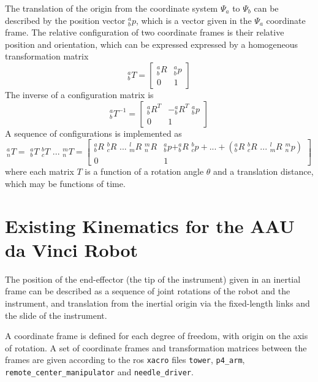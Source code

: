 The translation of the origin from the coordinate system $\Psi_a$ to $\Psi_b$ can be described by the position vector $^a_bp$, which is a vector given in the $\Psi_a$ coordinate frame.
The relative configuration of two coordinate frames is their relative position and orientation, which can be expressed expressed by a homogeneous transformation matrix
\begin{equation}
^a_bT = 
\begin{bmatrix}
^a_bR & ^a_bp\\
0 & 1
\end{bmatrix}
\end{equation}
The inverse of a configuration matrix is
\begin{equation}
^a_bT^{-1} = 
\begin{bmatrix}
^a_bR^T & -^a_bR^T\,\,^a_bp\\
0 & 1
\end{bmatrix}
\end{equation}
A sequence of configurations is implemented as
\begin{equation}
^a_nT =\,\, ^a_bT \,\, ^b_cT \,\,...\,\, ^m_nT = 
\begin{bmatrix}
^a_bR \,\, ^b_cR \,\,...\,\, ^l_mR \,\,^m_nR & ^a_bp + ^a_bR \,\, ^b_cp + ... + (^a_bR\,\, ^b_cR \,\,...\,\, ^l_mR \,\, ^m_np )\\
0 & 1
\end{bmatrix}
\end{equation}
where each matrix $T$ is a function of a rotation angle $\theta$ and a translation distance, which may be functions of time.


\section{Existing Kinematics for the AAU da Vinci Robot}
The position of the end-effector (the tip of the instrument) given in an inertial frame can be described as a sequence of joint rotations of the robot and the instrument, and translation from the inertial origin via the fixed-length links and the slide of the instrument.

A coordinate frame is defined for each degree of freedom, with origin on the axis of rotation. A set of coordinate frames and transformation matrices between the frames are given according to the \gls{ros} \texttt{xacro} files \texttt{tower}, \texttt{p4\_arm}, \texttt{remote\_center\_manipulator} and \texttt{needle\_driver}.

